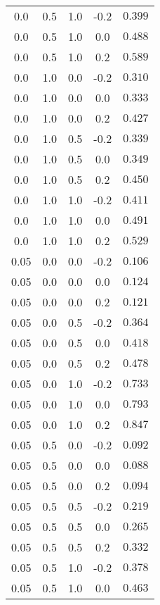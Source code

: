 \begin{longtable}{ccccc}
    0.0 & 0.5 & 1.0 & -0.2  & $0.399$ \\
    0.0 & 0.5 & 1.0 &  0.0  & $0.488$ \\
    0.0 & 0.5 & 1.0 &  0.2  & $0.589$ \\ \hline
    0.0 & 1.0 & 0.0 & -0.2  & $0.310$ \\
    0.0 & 1.0 & 0.0 &  0.0  & $0.333$ \\
    0.0 & 1.0 & 0.0 &  0.2  & $0.427$ \\ \hline
    0.0 & 1.0 & 0.5 & -0.2  & $0.339$ \\
    0.0 & 1.0 & 0.5 &  0.0  & $0.349$ \\
    0.0 & 1.0 & 0.5 &  0.2  & $0.450$ \\ \hline
    0.0 & 1.0 & 1.0 & -0.2  & $0.411$ \\
    0.0 & 1.0 & 1.0 &  0.0  & $0.491$ \\
    0.0 & 1.0 & 1.0 &  0.2  & $0.529$ \\ \hline
    0.05 & 0.0 & 0.0 & -0.2  & $0.106$ \\
    0.05 & 0.0 & 0.0 &  0.0  & $0.124$ \\
    0.05 & 0.0 & 0.0 &  0.2  & $0.121$ \\ \hline
    0.05 & 0.0 & 0.5 & -0.2  & $0.364$ \\
    0.05 & 0.0 & 0.5 &  0.0  & $0.418$ \\
    0.05 & 0.0 & 0.5 &  0.2  & $0.478$ \\ \hline
    0.05 & 0.0 & 1.0 & -0.2  & $0.733$ \\
    0.05 & 0.0 & 1.0 &  0.0  & $0.793$ \\
    0.05 & 0.0 & 1.0 &  0.2  & $0.847$ \\ \hline
    0.05 & 0.5 & 0.0 & -0.2  & $0.092$ \\
    0.05 & 0.5 & 0.0 &  0.0  & $0.088$ \\
    0.05 & 0.5 & 0.0 &  0.2  & $0.094$ \\ \hline
    0.05 & 0.5 & 0.5 & -0.2  & $0.219$ \\
    0.05 & 0.5 & 0.5 &  0.0  & $0.265$ \\
    0.05 & 0.5 & 0.5 &  0.2  & $0.332$ \\ \hline
    0.05 & 0.5 & 1.0 & -0.2  & $0.378$ \\
    0.05 & 0.5 & 1.0 &  0.0  & $0.463$ \\

\end{longtable}
